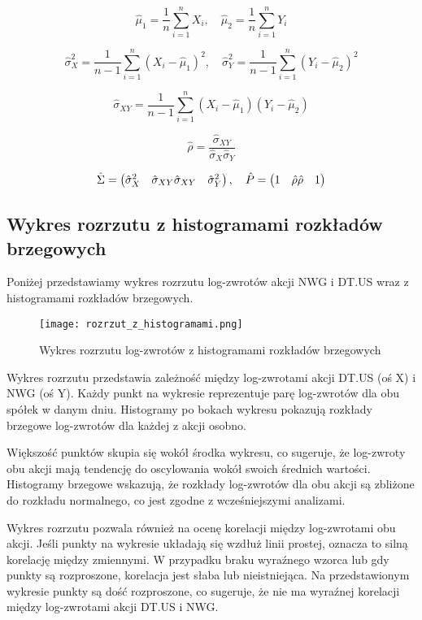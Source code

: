 \documentclass[a4paper,11pt]{article}
\def\\{\hfill\break}
\begin{document}
\[
\hat{\mu}_1 = \frac{1}{n} \sum_{i=1}^{n} X_i, \quad \hat{\mu}_2 = \frac{1}{n} \sum_{i=1}^{n} Y_i
\]

\[
\hat{\sigma}_{X}^2 = \frac{1}{n-1} \sum_{i=1}^{n} (X_i - \hat{\mu}_1)^2, \quad \hat{\sigma}_{Y}^2 = \frac{1}{n-1} \sum_{i=1}^{n} (Y_i - \hat{\mu}_2)^2
\]

\[
\hat{\sigma}_{XY} = \frac{1}{n-1} \sum_{i=1}^{n} (X_i - \hat{\mu}_1)(Y_i - \hat{\mu}_2)
\]

\[
\hat{\rho} = \frac{\hat{\sigma}_{XY}}{\hat{\sigma}_X \hat{\sigma}_Y}
\]

\[
\hat{\Sigma} = \begin{pmatrix}
\hat{\sigma}_X^2 & \hat{\sigma}_{XY} \\
\hat{\sigma}_{XY} & \hat{\sigma}_Y^2
\end{pmatrix}, \quad \hat{P} = \begin{pmatrix}
1 & \hat{\rho} \\
\hat{\rho} & 1
\end{pmatrix}
\]

\subsection{Wykres rozrzutu z histogramami rozkładów brzegowych}
Poniżej przedstawiamy wykres rozrzutu log-zwrotów akcji NWG i DT.US wraz z histogramami rozkładów brzegowych.

\begin{figure}[h]
\centering
\texttt{[image: rozrzut\_z\_histogramami.png]}
\caption{Wykres rozrzutu log-zwrotów z histogramami rozkładów brzegowych}
\end{figure}

Wykres rozrzutu przedstawia zależność między log-zwrotami akcji DT.US (oś X) i NWG (oś Y). Każdy punkt na wykresie reprezentuje parę log-zwrotów dla obu spółek w danym dniu. Histogramy po bokach wykresu pokazują rozkłady brzegowe log-zwrotów dla każdej z akcji osobno.

Większość punktów skupia się wokół środka wykresu, co sugeruje, że log-zwroty obu akcji mają tendencję do oscylowania wokół swoich średnich wartości. Histogramy brzegowe wskazują, że rozkłady log-zwrotów dla obu akcji są zbliżone do rozkładu normalnego, co jest zgodne z wcześniejszymi analizami.

Wykres rozrzutu pozwala również na ocenę korelacji między log-zwrotami obu akcji. Jeśli punkty na wykresie układają się wzdłuż linii prostej, oznacza to silną korelację między zmiennymi. W przypadku braku wyraźnego wzorca lub gdy punkty są rozproszone, korelacja jest słaba lub nieistniejąca. Na przedstawionym wykresie punkty są dość rozproszone, co sugeruje, że nie ma wyraźnej korelacji między log-zwrotami akcji DT.US i NWG.
\end{document}
